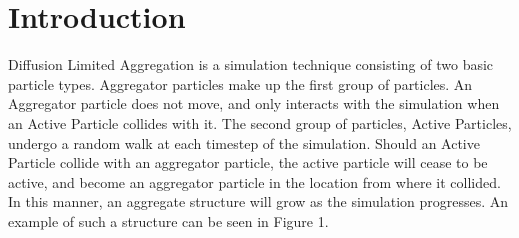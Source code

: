 \documentclass[fleqn,10pt]{SelfArx} %
\begin{document}
\flushbottom %

\maketitle %

\tableofcontents %

\thispagestyle{empty} %


\section*{Introduction} %


Diffusion Limited Aggregation is a simulation technique consisting of two basic particle types. Aggregator particles make up the first group of particles. An Aggregator particle does not move, and only interacts with the simulation when an Active Particle collides with it. The second group of particles, Active Particles, undergo a random walk at each timestep of the simulation. Should an Active Particle collide with an aggregator particle, the active particle will cease to be active, and become an aggregator particle in the location from where it collided. In this manner, an aggregate structure will grow as the simulation progresses. An example of such a structure can be seen in Figure 1.
\end{document}
